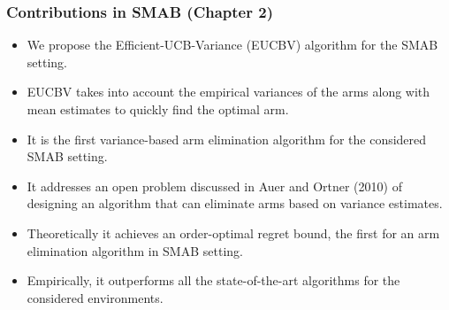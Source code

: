 \begin{frame}
\frametitle{Contributions in SMAB ({Chapter 2})}
\begin{itemize}
\item<1-> We propose the Efficient-UCB-Variance (EUCBV) algorithm for the SMAB setting.
\item<2-> EUCBV takes into account the empirical variances of the arms along with mean estimates to quickly find the optimal arm.
\item<3-> It is the first variance-based arm elimination algorithm for the considered SMAB setting. 
\item<4-> It addresses an open problem discussed in {Auer and Ortner (2010)} of designing an algorithm that can eliminate arms based on variance estimates.
\item<5-> Theoretically it achieves an order-optimal regret bound, the first for an arm elimination algorithm in SMAB setting.
\item<6-> Empirically, it outperforms all the state-of-the-art algorithms for the considered environments.
\end{itemize}
\end{frame}
